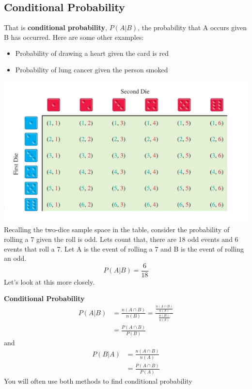 \documentclass[14pt]{extarticle}
\begin{document}
\subsection{Conditional Probability}
That is \textbf{conditional probability}, $P(A|B)$, the probability that A occurs given B has occurred. Here are some other examples:
\begin{itemize}
	\item Probability of drawing a heart given the card is red
	\item Probability of lung cancer given the person smoked
\end{itemize}
\includegraphics[width=0.9\linewidth]{8-1-5}
\\
Recalling the two-dice sample space in the table, consider the probability of rolling a 7 given the roll is odd. Lets count that, there are 18 odd events and 6 events that roll a 7. Let A is the event of rolling a 7 and B is the event of rolling an odd.
$$P(A|B) = \frac{6}{18}$$
Let's look at this more closely.
\begin{tcolorbox}[enhanced jigsaw,colback=bg,boxrule=0pt,arc=0pt] 
	\textbf{Conditional Probability}
	\begin{align*}
		P(A|B)&=\frac{n(A\cap B)}{n( B)} = \frac{\frac{n(A\cap B)}{n(S)}}{\frac{n(B)}{n(S)}} \\
		&= \frac{P(A\cap B)}{P(B)}
	\end{align*}
and
\begin{align*}
	P(B|A)&=\frac{n(A\cap B)}{n(A)} \\
	&= \frac{P(A\cap B)}{P(A)}
\end{align*}
You will often use both methods to find conditional probability
\end{tcolorbox}
\end{document}
